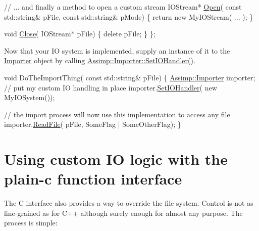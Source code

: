 \begin{DoxyCode}
  \textcolor{comment}{// ... and finally a method to open a custom stream}
  IOStream* \hyperlink{class_assimp_1_1_i_o_system_ac512ece3b0701de5682553007a4c0816}{Open}( \textcolor{keyword}{const} std::string& pFile, \textcolor{keyword}{const} std::string& pMode) \{
    \textcolor{keywordflow}{return} \textcolor{keyword}{new} MyIOStream( ... ); 
  \}

  \textcolor{keywordtype}{void} \hyperlink{class_assimp_1_1_i_o_system_a8c334d60f04bceeb6bd0157d21723f3e}{Close}( IOStream* pFile) \{ \textcolor{keyword}{delete} pFile; \}
\};
\end{DoxyCode}


Now that your I\+O system is implemented, supply an instance of it to the \hyperlink{class_importer}{Importer} object by calling \hyperlink{class_assimp_1_1_importer_ac1c92d84d21c35dea6e5ad96a976c2ca}{Assimp\+::\+Importer\+::\+Set\+I\+O\+Handler()}.


\begin{DoxyCode}
\textcolor{keywordtype}{void} DoTheImportThing( \textcolor{keyword}{const} std::string& pFile)
\{
  \hyperlink{class_assimp_1_1_importer}{Assimp::Importer} importer;
  \textcolor{comment}{// put my custom IO handling in place}
  importer.\hyperlink{class_assimp_1_1_importer_ac1c92d84d21c35dea6e5ad96a976c2ca}{SetIOHandler}( \textcolor{keyword}{new} MyIOSystem());

  \textcolor{comment}{// the import process will now use this implementation to access any file}
  importer.\hyperlink{class_assimp_1_1_importer_afa338a135a56956bd5deb7d238498dde}{ReadFile}( pFile, SomeFlag | SomeOtherFlag);
\}
\end{DoxyCode}
\hypertarget{usage_custom_io_c}{}\section{Using custom I\+O logic with the plain-\/c function interface}\label{usage_custom_io_c}
The C interface also provides a way to override the file system. Control is not as fine-\/grained as for C++ although surely enough for almost any purpose. The process is simple\+:



